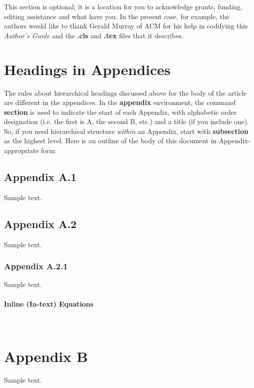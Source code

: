 \documentclass[acmtog, authorversion]{acmart}
\begin{document}
\begin{acks}
This section is optional; it is a location for you to acknowledge
grants, funding, editing assistance and what have you.  In the
present case, for example, the authors would like to thank Gerald
Murray of ACM for his help in codifying this \textit{Author's
Guide} and the \textbf{.cls} and \textbf{.tex} files that it
describes.
\end{acks}




\appendix
\section{Headings in Appendices}
The rules about hierarchical headings discussed above for the body
of the article are different in the appendices. In the
\textbf{appendix} environment, the command \textbf{section} is
used to indicate the start of each Appendix, with alphabetic order
designation (i.e. the first is A, the second B, etc.) and a title
(if you include one).  So, if you need hierarchical structure
\textit{within} an Appendix, start with \textbf{subsection} as the
highest level. Here is an outline of the body of this document in
Appendix-appropriate form:
\subsection{Appendix A.1}
Sample text.
\subsection{Appendix A.2}
Sample text.
\subsubsection{Appendix A.2.1}
Sample text.

\paragraph{Inline (In-text) Equations}
\
\section{Appendix B}
Sample text.
\end{document}
